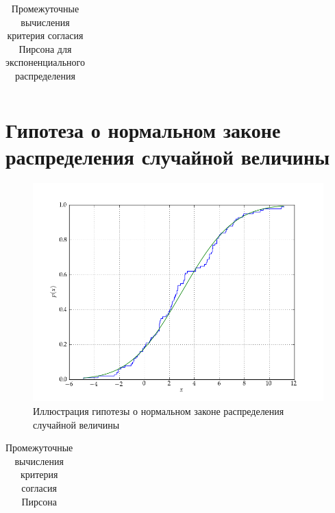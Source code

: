 \documentclass[a4paper,12pt]{report}
\begin{document}
\begin{table}[h!]
  \renewcommand{\tabcolsep}{1em}
  \centering
  \begin{tabular}{|c|c|c|c|c|c|c|c|}
    \hline %
    
  \end{tabular}
  \caption{Промежуточные вычисления критерия согласия Пирсона для экспоненциального распределения}
\end{table}

\newpage


\section*{Гипотеза о нормальном законе \\
  распределения случайной величины}

\begin{figure}[h!] 
  \centering
  \includegraphics[width=0.8\linewidth]{../pic/sample_normal.png}
  \caption{Иллюстрация гипотезы о нормальном законе распределения случайной величины}
\end{figure}

\begin{table}[h!]
  \renewcommand{\tabcolsep}{1em}
  \centering
  \begin{tabular}{|c|c|c|c|c|c|c|c|}
    \hline %
    
  \end{tabular}
  \caption{Промежуточные вычисления критерия согласия Пирсона}
\end{table}

\newpage
\end{document}
